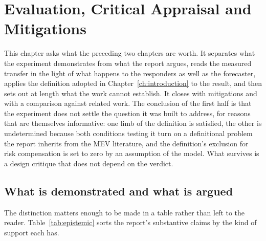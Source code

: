 \chapter{Evaluation, Critical Appraisal and Mitigations}
\label{ch:evaluation}

This chapter asks what the preceding two chapters are worth. It separates what the
experiment demonstrates from what the report argues, reads the measured transfer in the
light of what happens to the responders as well as the forecaster, applies the definition
adopted in Chapter~\ref{ch:introduction} to the result, and then sets out at length what the
work cannot establish. It closes with mitigations and with a comparison against related
work. The conclusion of the first half is that the experiment does not settle the question it
was built to address, for reasons that are themselves informative: one limb of the
definition is satisfied, the other is undetermined because both conditions testing it turn
on a definitional problem the report inherits from the MEV literature, and the definition's
exclusion for risk compensation is set to zero by an assumption of the model. What survives is a design critique that does not depend on the verdict.

\section{What is demonstrated and what is argued}
\label{sec:demonstrated}

The distinction matters enough to be made in a table rather than left to the reader.
Table~\ref{tab:epistemic} sorts the report's substantive claims by the kind of support each
has.

